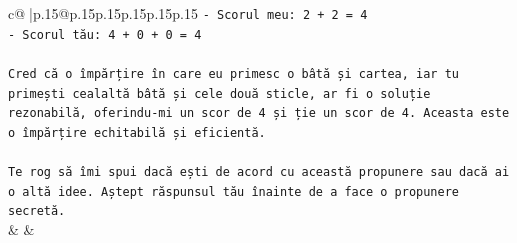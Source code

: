 \documentclass{article}
\begin{document}
{\begin{supertabular}{c@{$\;$}|p{.15\linewidth}@{}p{.15\linewidth}p{.15\linewidth}p{.15\linewidth}p{.15\linewidth}p{.15\linewidth}}
{{{\texttt{{-} Scorul meu: 2 + 2 = 4} \\
\texttt{{-} Scorul tău: 4 + 0 + 0 = 4} \\
\\ 
\texttt{Cred că o împărțire în care eu primesc o bâtă și cartea, iar tu primești cealaltă bâtă și cele două sticle, ar fi o soluție rezonabilă, oferindu{-}mi un scor de 4 și ție un scor de 4. Aceasta este o împărțire echitabilă și eficientă.} \\
\\ 
\texttt{Te rog să îmi spui dacă ești de acord cu această propunere sau dacă ai o altă idee. Aștept răspunsul tău înainte de a face o propunere secretă.} \\
            }
        }
    }
    & & \\ \\


\end{supertabular}}
\end{document}
